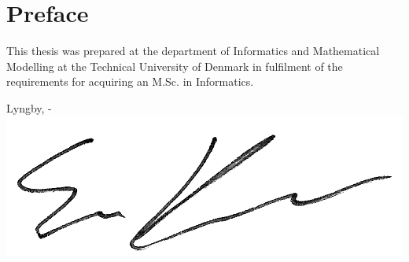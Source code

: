 \chapter{Preface}

This thesis was prepared at the department of Informatics and Mathematical
Modelling at the Technical University of Denmark in fulfilment of the
requirements for acquiring an M.Sc. in Informatics.
\vspace{20mm}
\begin{center}
    \hspace{20mm} Lyngby, \thesishandin-\thesisyear
    \vspace{5mm}
    \newline
    \includegraphics[scale=0.095]{figures/Signature}
\end{center}
\begin{flushright}
    \thesisauthor
\end{flushright}
